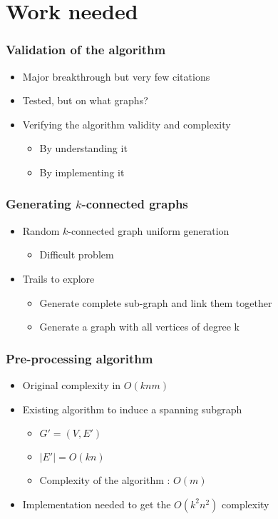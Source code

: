 \documentclass[xcolor=dvipsnames]{beamer}
\begin{document}
\section{Work needed}

\begin{frame}
  \frametitle{Validation of the algorithm}
  \begin{itemize}
  \item Major breakthrough but very few citations
  \item Tested, but on what graphs?
  \item Verifying the algorithm validity and complexity
    \begin{itemize}
    \item By understanding it
    \item By implementing it
    \end{itemize}
  \end{itemize}
\end{frame}

\begin{frame}
  \frametitle{Generating $k$-connected graphs}
  \begin{itemize}
    \item Random $k$-connected graph uniform generation
      \begin{itemize}
      \item Difficult problem
      \end{itemize}
    \item Trails to explore
      \begin{itemize}
      \item Generate complete sub-graph and link them together
      \item Generate a graph with all vertices of degree k
      \end{itemize}
  \end{itemize}

\end{frame}

\begin{frame}
  \frametitle{Pre-processing algorithm}
  \begin{itemize}
  \item Original complexity in $O(k n m)$
  \item Existing algorithm to induce a spanning subgraph\cite{NaIb92}
    \begin{itemize}
    \item $G' = (V,E')$
    \item $|E'| = O(k n)$
    \item Complexity of the algorithm : $O(m)$
    \end{itemize}
  \item Implementation needed to get the $O(k^2 n^2)$ complexity
  \end{itemize}
\end{frame}
\end{document}
